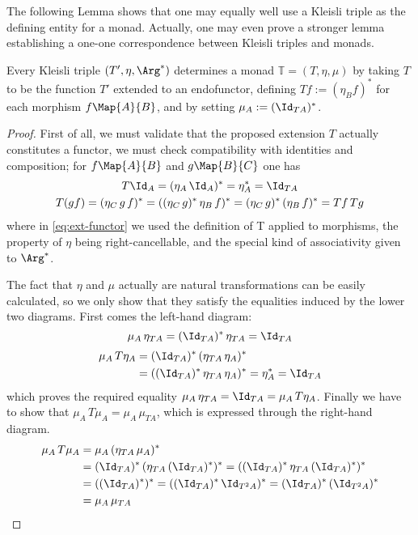 The following Lemma shows that one may equally well use a Kleisli triple as the
defining entity for a monad. Actually, one may even prove a stronger lemma
establishing a one-one correspondence between Kleisli triples and monads.
\begin{lem}
  Every Kleisli triple $(T', \eta, \Arg^*)$ determines a monad $\mathbb{T} = (T,
  \eta, \mu)$ by taking $T$ to be the function $T'$ extended to an endofunctor,
  defining $T f := (\eta_B f)^*$ for each morphism $f \Map{A}{B}$, and by setting
  $\mu_A := (\Id_{T A})^*$.
\end{lem}
\begin{proof}
First of all, we must validate that the proposed extension $T$ actually
constitutes a functor, \IE we must check compatibility with identities and
composition; for $f \Map{A}{B}$ and $g \Map{B}{C}$ one has
\begin{gather}
  T \Id_A = (\eta_A\, \Id_A)^* = \eta_A^* = \Id_{T A} \\
  \label{eq:ext-functor}
  T (g f) = (\eta_C\, g\, f)^* = ((\eta_C\, g)^*\, \eta_B\, f)^* = (\eta_C\, g)^*\, (\eta_B\,
  f)^* = T f\, T g
\end{gather}
where in \eqref{eq:ext-functor} we used the definition of T applied to
morphisms, the property of $\eta$ being right-cancellable, and the special kind
of associativity given to $\Arg^*$.

The fact that $\eta$ and $\mu$ actually are natural transformations can be
easily calculated, so we only show that they satisfy the equalities induced by
the lower two diagrams. First comes the left-hand diagram:
\begin{equation}
    \mu_A\, \eta_{T A} = (\Id_{TA})^*\, \eta_{T A} = \Id_{T A}
\end{equation} 
\begin{equation}
  \begin{split}
    \mu_A\, T\eta_A &= (\Id_{T A})^*\, (\eta_{T A}\, \eta_A)^*\\
              &= ((\Id_{T A})^*\, \eta_{T A}\, \eta_A)^* = \eta_A^* = \Id_{T A}
  \end{split}
\end{equation}
which proves the required equality $\mu_A\, \eta_{T A} = \Id_{T A} = \mu_A\,
T\eta_A$. Finally we have to show that $\mu_A\, T\mu_A = \mu_A\, \mu_{T A}$, which is
expressed through the right-hand diagram.
\begin{equation}
  \begin{split}
    \mu_A\, T\mu_A &= \mu_A\, (\eta_{T A}\, \mu_A)^*\\
              &= (\Id_{T A})^*\, (\eta_{T A}\, (\Id_{T A})^*)^*
              = ((\Id_{T A})^*\, \eta_{T A}\, (\Id_{T A})^*)^*\\
              &= ((\Id_{T A})^*)^*
              = ((\Id_{T A})^*\, \Id_{T^2A})^*
              = (\Id_{T A})^*\, (\Id_{T^2A})^*\\
              &= \mu_A\, \mu_{T A}
  \end{split}
\end{equation}
\end{proof}




